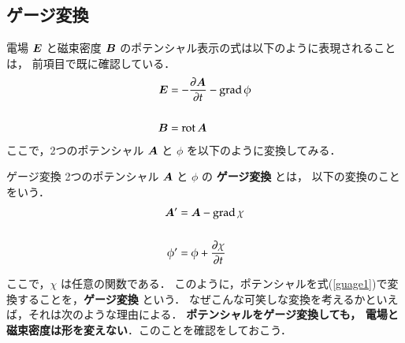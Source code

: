         \subsection{ゲージ変換}
            電場 $\boldsymbol{E}$ と磁束密度 $\boldsymbol{B}$ のポテンシャル表示の式は以下のように表現されることは，
            前項目で既に確認している．
                    \begin{align}
                            \bE&=-\displaystyle
                            \frac{\rd\bA}{\rd t}-\mathrm{grad\,}\phi \\  \notag \\
                            \vspace{2mm}
                            \bB&=\mathrm{rot\,}\bA
                    \end{align}
            ここで，2つのポテンシャル $\boldsymbol{A}$ と $\phi$ を以下のように変換してみる．\\
                        \begin{myshadebox}{ゲージ変換}
                            2つのポテンシャル $\boldsymbol{A}$ と $\phi$ の \textbf{ゲージ変換} とは，
                            以下の変換のことをいう．
                            \begin{align}\label{guage1}
                                \bA'&=\bA-\dgrad\chi \\ \notag \\
                                \phi ' &=\phi +\frac{\rd \chi}{\rd t}
                            \end{align}
                        \end{myshadebox}

            ここで，$\chi$ は任意の関数である．
            このように，ポテンシャルを式(\ref{guage1})で変換することを，\textbf{ゲージ変換} という．
            なぜこんな可笑しな変換を考えるかといえば，それは次のような理由による．
            \textbf{ポテンシャルをゲージ変換しても，
            電場と磁束密度は形を変えない}．このことを確認をしておこう．

